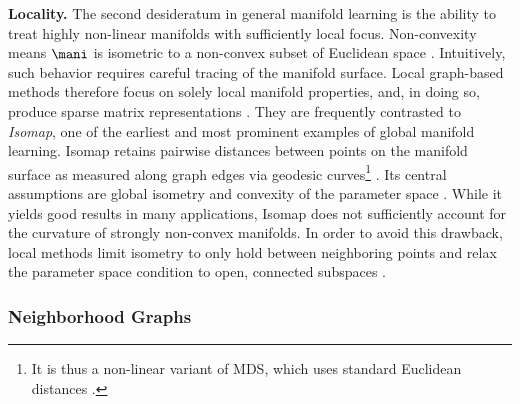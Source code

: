 \textbf{Locality.} The second desideratum in general manifold learning is the 
ability to treat highly non-linear manifolds with sufficiently local focus.
Non-convexity means $\mani$ is isometric to a non-convex subset of Euclidean 
space \citep{donohogrimes2003}. 
Intuitively, such behavior requires careful tracing of the manifold surface.
Local graph-based methods therefore focus on solely local manifold properties, 
and, in doing so, produce sparse matrix representations \citep{cayton2005}.
They are frequently contrasted to \textit{Isomap}, one of the 
earliest and most prominent examples of global manifold learning.
Isomap retains pairwise distances between points on the manifold surface as 
measured along graph edges via geodesic curves\footnote{
It is thus a non-linear variant of MDS, which uses standard Euclidean distances 
\citep{tenenbaumdesilvalangford2000}.
} \citep{tenenbaumdesilvalangford2000}.
Its central assumptions are global isometry and convexity of the parameter 
space \citep{tenenbaumdesilvalangford2000}.
While it yields good results in many applications, Isomap does not sufficiently 
account for the curvature of strongly non-convex manifolds.
In order to avoid this drawback, local methods limit isometry to only hold 
between neighboring points and relax the parameter space 
condition to open, connected subspaces \citep{donohogrimes2003}.


\subsubsection{Neighborhood Graphs}
\label{algo-common}

